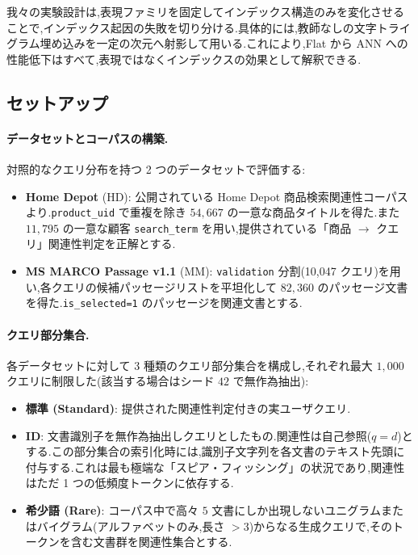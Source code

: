 \documentclass[conference]{IEEEtran}
\begin{document}
我々の実験設計は,表現ファミリを固定してインデックス構造のみを変化させることで,インデックス起因の失敗を切り分ける.具体的には,教師なしの文字トライグラム埋め込みを一定の次元へ射影して用いる.これにより,Flat から ANN への性能低下はすべて,表現ではなくインデックスの効果として解釈できる.

\subsection{セットアップ}\label{sec:setup}

\paragraph{データセットとコーパスの構築.}
対照的なクエリ分布を持つ 2 つのデータセットで評価する:
\begin{itemize}
\item \textbf{Home Depot} (HD): 公開されている Home Depot 商品検索関連性コーパスより.\texttt{product\_uid} で重複を除き $54{,}667$ の一意な商品タイトルを得た.また $11{,}795$ の一意な顧客 \texttt{search\_term} を用い,提供されている「商品 $\to$ クエリ」関連性判定を正解とする.
\item \textbf{MS MARCO Passage v1.1} (MM): \texttt{validation} 分割(10{,}047 クエリ)を用い,各クエリの候補パッセージリストを平坦化して $82{,}360$ のパッセージ文書を得た.\texttt{is\_selected=1} のパッセージを関連文書とする.
\end{itemize}

\paragraph{クエリ部分集合.}
各データセットに対して 3 種類のクエリ部分集合を構成し,それぞれ最大 $1{,}000$ クエリに制限した(該当する場合はシード $42$ で無作為抽出):
\begin{itemize}
\item \textbf{標準 (Standard)}: 提供された関連性判定付きの実ユーザクエリ.
\item \textbf{ID}: 文書識別子を無作為抽出しクエリとしたもの.関連性は自己参照($q{=}d$)とする.この部分集合の索引化時には,識別子文字列を各文書のテキスト先頭に付与する.これは最も極端な「スピア・フィッシング」の状況であり,関連性はただ 1 つの低頻度トークンに依存する.
\item \textbf{希少語 (Rare)}: コーパス中で高々 $5$ 文書にしか出現しないユニグラムまたはバイグラム(アルファベットのみ,長さ $>3$)からなる生成クエリで,そのトークンを含む文書群を関連性集合とする.
\end{itemize}
\end{document}
